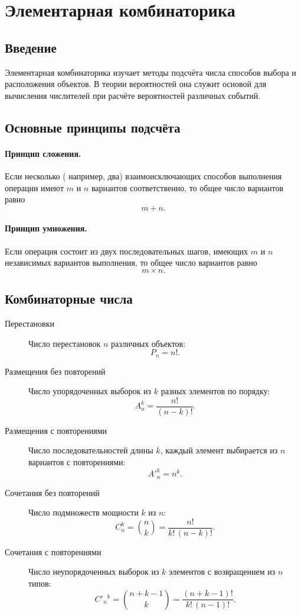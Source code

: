 \section{Элементарная комбинаторика}
\subsection{Введение}
Элементарная комбинаторика изучает методы подсчёта числа способов выбора и расположения объектов. В теории вероятностей она служит основой для вычисления числителей при расчёте вероятностей различных событий.

\subsection{Основные принципы подсчёта}
\paragraph{Принцип сложения.} Если несколько (
например, два) взаимоисключающих способов выполнения операции имеют $m$ и $n$ вариантов соответственно, то общее число вариантов равно
$$m + n.$$ 
\paragraph{Принцип умножения.} Если операция состоит из двух последовательных шагов, имеющих $m$ и $n$ независимых вариантов выполнения, то общее число вариантов равно
$$m \times n.$$ 

\subsection{Комбинаторные числа}
\begin{description}
	\item[Перестановки] Число перестановок $n$ различных объектов:
	\begin{equation*}
		P_n = n!.
	\end{equation*}
	\item[Размещения без повторений] Число упорядоченных выборок из $k$ разных элементов по порядку:
	\begin{equation*}
		A_n^k = \frac{n!}{(n-k)!}.
	\end{equation*}
	\item[Размещения с повторениями] Число последовательностей длины $k$, каждый элемент выбирается из $n$ вариантов с повторениями:
	\begin{equation*}
		{A'}_n^k = n^k.
	\end{equation*}
	\item[Сочетания без повторений] Число подмножеств мощности $k$ из $n$:
	\begin{equation*}
		C_n^k = \binom{n}{k} = \frac{n!}{k!\,(n-k)!}.
	\end{equation*}
	\item[Сочетания с повторениями] Число неупорядоченных выборок из $k$ элементов с возвращением из $n$ типов:
	\begin{equation*}
		{C'}_n{}^k = \binom{n + k -1}{k} = \frac{(n + k -1)!}{k!\,(n-1)!}.
	\end{equation*}
\end{description}

